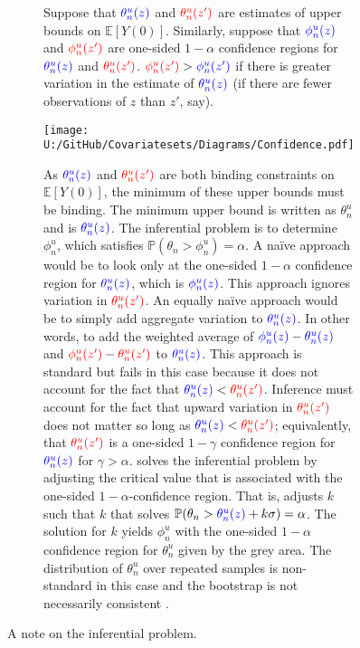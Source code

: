 \documentclass[10pt,a4paper,twoside]{article}
\numberwithin{equation}{section}
\begin{document}
\begin{figure}[p]
\centering
\begin{subfigure}{0.8\textwidth}
\caption{Suppose that $\color{blue}\theta_n^u(z)\color{black}$ and $\color{red}\theta_n^u(z')\color{black}$ are estimates of upper bounds on $\mathbb{E}[Y(0)]$. Similarly, suppose that $\color{blue}\phi_n^u(z)\color{black}$ and $\color{red}\phi_n^u(z')\color{black}$ are one-sided $1-\alpha$ confidence regions for $\color{blue}\theta_n^u(z)\color{black}$ and $\color{red}\theta_n^u(z')\color{black}$. $\color{red}\phi_n^u(z')\color{black}>\color{blue}\phi_n^u(z')\color{black}$ if there is greater variation in the estimate of $\color{blue}\theta_n^u(z)\color{black}$ (if there are fewer observations of $z$ than $z'$, say).}
\texttt{[image: U:/GitHub/Covariatesets/Diagrams/Confidence.pdf]}
\caption{As $\color{blue}\theta_n^u(z)\color{black}$ and $\color{red}\theta_n^u(z')\color{black}$ are both binding constraints on $\mathbb{E}[Y(0)]$, the minimum of these upper bounds must be binding. The minimum upper bound is written as $\theta^u_n$ and is $\color{blue}\theta_n^u(z)\color{black}$. The inferential problem is to determine $\phi_n^u$, which satisfies 
$\mathbb{P}(\theta_n>\phi_n^u)=\alpha$. A na{\"i}ve approach would be to look only at the one-sided $1-\alpha$ confidence region for $\color{blue}\theta_n^u(z)\color{black}$, which is $\color{blue}\phi_n^u(z)\color{black}$. This approach ignores variation in $\color{red}\theta_n^u(z')\color{black}$. An equally na{\"i}ve approach would be to simply add aggregate variation to $\color{blue}\theta_n^u(z)\color{black}$. In other words, to add the weighted average of $\color{blue}\phi_n^u(z)\color{black}-\color{blue}\theta_n^u(z)\color{black}$ and $\color{red}\phi_n^u(z')\color{black}-\color{red}\theta_n^u(z')\color{black}$ to $\color{blue}\theta_n^u(z)\color{black}$. This approach is standard but fails in this case because it does not account for the fact that $\color{blue}\theta_n^u(z)\color{black}<\color{red}\theta_n^u(z')\color{black}$. Inference must account for the fact that upward variation in $\color{red}\theta_n^u(z')\color{black}$ does not matter so long as $\color{blue}\theta_n^u(z)\color{black}<\color{red}\theta_n^u(z')\color{black}$; equivalently, that $\color{red}\theta_n^u(z')\color{black}$ is a one-sided $1-\gamma$ confidence region for $\color{blue}\theta_n^u(z)\color{black}$ for $\gamma>\alpha$. \cite{cHlr13} solves the inferential problem by adjusting the critical value that is associated with the one-sided $1-\alpha$-confidence region. That is, \cite{cHlr13} adjusts $k$ such that $k$ that solves $\mathbb{P}(\theta_n>\color{blue}\theta_n^u(z)\color{black}+k\sigma)=\alpha$. The solution for $k$ yields $\phi_n^u$ with the one-sided $1-\alpha$ confidence region for $\theta_n^u$ given by the grey area. The distribution of $\theta_n^u$ over repeated samples is non-standard in this case and the bootstrap is  not necessarily consistent \citep{bU10}.} 
\end{subfigure}
\caption{A note on the inferential problem.}
\label{fig:confidence}
\end{figure}
\end{document}
